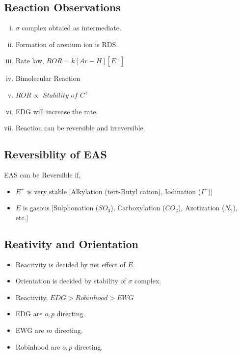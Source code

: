 \documentclass{article}
\begin{document}
\subsection{Reaction Observations}
\begin{enumerate}[i.]
    \item $\sigma$ complex obtaied as intermediate.
    \item Formation of arenium ion is RDS.
    \item Rate law, $ROR=k [Ar-H][E^+]$
    \item Bimolecular Reaction
    \item $ROR \propto \textit{ Stability of  } C^+$
    \item EDG will increase the rate.
    \item Reaction can be reversible and irreversible.
\end{enumerate}
\subsection{Reversiblity of EAS}
EAS can be Reversible if,
\begin{itemize}
    \item $E^+$ is very stable [Alkylation (tert-Butyl cation), Iodination ($I^+$)]
    \item $E$ is gasous [Sulphonation ($SO_{3}$), Carboxylation ($CO_{2}$), Azotization ($N_{2}$), etc.]
\end{itemize}
\subsection{Reativity and Orientation}
\begin{itemize}
    \item Reacitvity is decided by net effect of $E$.
    \item Orientation is decided by stability of $\sigma$ complex.
    \item Reactivity, $EDG>Robinhood>EWG$
    \item EDG are $o,p$ directing.
    \item EWG are $m$ directing.
    \item Robinhood are $o,p$ directing.
\end{itemize}
\end{document}
